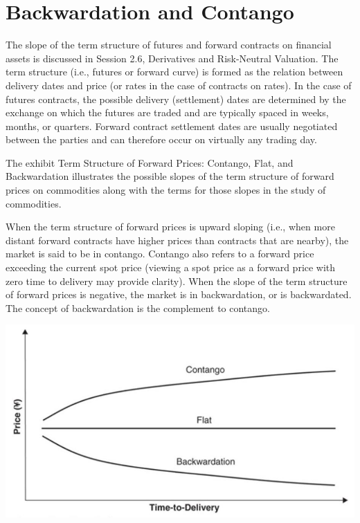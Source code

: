 \documentclass[11pt]{article}
\begin{document}
\section*{Backwardation and Contango}
The slope of the term structure of futures and forward contracts on financial assets is discussed in Session 2.6, Derivatives and Risk-Neutral Valuation. The term structure (i.e., futures or forward curve) is formed as the relation between delivery dates and price (or rates in the case of contracts on rates). In the case of futures contracts, the possible delivery (settlement) dates are determined by the exchange on which the futures are traded and are typically spaced in weeks, months, or quarters. Forward contract settlement dates are usually negotiated between the parties and can therefore occur on virtually any trading day.

The exhibit Term Structure of Forward Prices: Contango, Flat, and Backwardation illustrates the possible slopes of the term structure of forward prices on commodities along with the terms for those slopes in the study of commodities.

When the term structure of forward prices is upward sloping (i.e., when more distant forward contracts have higher prices than contracts that are nearby), the market is said to be in contango. Contango also refers to a forward price exceeding the current spot price (viewing a spot price as a forward price with zero time to delivery may provide clarity). When the slope of the term structure of forward prices is negative, the market is in backwardation, or is backwardated. The concept of backwardation is the complement to contango.

\begin{center}
\includegraphics[max width=\textwidth]{2024_04_11_00d1b46832d5f98705cdg-3}
\end{center}
\end{document}

